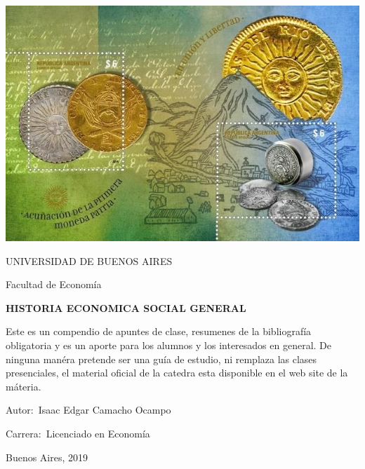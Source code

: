 \documentclass[12pt]{book}
\begin{document}
\thispagestyle{empty}

\begin {center}

\includegraphics[scale=.4]{1484058646033.jpg}

\medskip
UNIVERSIDAD DE BUENOS AIRES

Facultad de Econom\'ia


\vspace{3cm}


\textbf{\large HISTORIA ECONOMICA SOCIAL GENERAL}

\vspace{2cm}


Este es un compendio de apuntes de clase, resumenes de la bibliograf\'ia obligatoria y es un aporte para los alumnos y los interesados en general.
De ninguna man\'era pretende ser una gu\'ia de estudio, ni remplaza las clases presenciales, el material oficial de la catedra esta disponible en el web site de la m\'ateria.
\\

\end {center}


\vspace{2.5cm}

\noindent Autor:\,	Isaac Edgar Camacho Ocampo
 
\noindent Carrera:\,	Licenciado en Econom\'ia

\vspace{1cm}

\vspace{1cm}

\noindent Buenos Aires, 2019

\newpage


\tableofcontents
\end{document}
